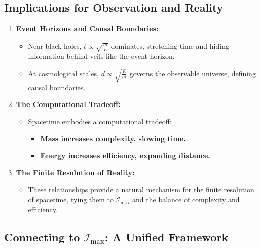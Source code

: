 \documentclass[12pt]{article}
\begin{document}
\subsection{Implications for Observation and Reality}

\begin{enumerate}
    \item \textbf{Event Horizons and Causal Boundaries:}
    \begin{itemize}
        \item Near black holes, $t \propto \sqrt{\frac{m}{E}}$ dominates, stretching time and hiding information behind veils like the event horizon.
        \item At cosmological scales, $d \propto \sqrt{\frac{E}{m}}$ governs the observable universe, defining causal boundaries.
    \end{itemize}

    \item \textbf{The Computational Tradeoff:}
    \begin{itemize}
        \item Spacetime embodies a computational tradeoff:
        \begin{itemize}
            \item \textbf{Mass increases complexity, slowing time.}
            \item \textbf{Energy increases efficiency, expanding distance.}
        \end{itemize}
    \end{itemize}

    \item \textbf{The Finite Resolution of Reality:}
    \begin{itemize}
        \item These relationships provide a natural mechanism for the finite resolution of spacetime, tying them to $\mathcal{I}_{\text{max}}$ and the balance of complexity and efficiency.
    \end{itemize}
\end{enumerate}

\subsection{Connecting to $\mathcal{I}_{\text{max}}$: A Unified Framework}
\end{document}
